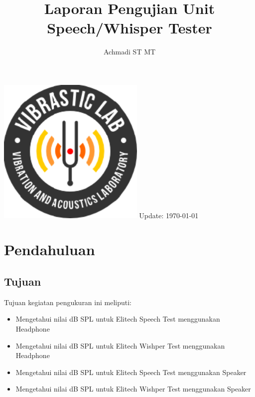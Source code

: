 \documentclass[12pt,]{article}
\title{\LARGE \bf
	Laporan Pengujian Unit Speech/Whisper Tester\\
}
\author{Achmadi ST MT}
\date{}
\begin{document}
	\thispagestyle{empty}
	
	\begin{titlepage}
		\centering
		\vfill
		\vfill
		\maketitle
		\vfill
		\includegraphics[width=200pt]{images/logo/logoviblab}
		\vfill
		\vfill
		Update: {\today} \currenttime \\
	\end{titlepage}
	
	
	\newpage
	\tableofcontents
	
	
	\newpage
	\section{Pendahuluan}
	
	\subsection{Tujuan}
	
	Tujuan kegiatan pengukuran ini meliputi:
	\begin{itemize}
		\item Mengetahui nilai dB SPL untuk Elitech Speech Test menggunakan Headphone
		\item Mengetahui nilai dB SPL untuk Elitech Wishper Test menggunakan Headphone
		\item Mengetahui nilai dB SPL untuk Elitech Speech Test menggunakan Speaker
		\item Mengetahui nilai dB SPL untuk Elitech Wishper Test menggunakan Speaker
	\end{itemize}
	
\end{document}
